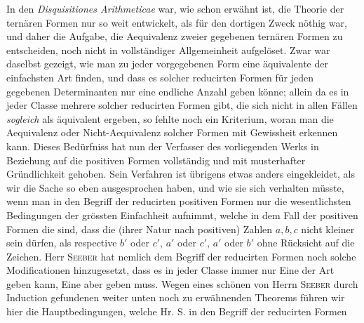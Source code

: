 In den \emph{Disquisitiones Arithmeticae} war, wie schon erwähnt ist, die Theorie der ternären Formen nur so weit entwickelt, als für den dortigen Zweck nöthig war, und daher die Aufgabe, die Aequivalenz zweier gegebenen ternären Formen zu entscheiden, noch nicht in vollständiger Allgemeinheit aufgelöset. Zwar war daselbst gezeigt, wie man zu jeder vorgegebenen Form eine äquivalente der einfachsten Art finden, und dass es solcher reducirten Formen für jeden gegebenen Determinanten nur eine endliche Anzahl geben könne; allein da es in jeder Classe mehrere solcher reducirten Formen gibt, die sich nicht in allen Fällen \emph{sogleich} als äquivalent ergeben, so fehlte noch ein Kriterium, woran man die Aequivalenz oder Nicht-Aequivalenz solcher Formen mit Gewissheit erkennen kann. Dieses Bedürfniss hat nun der Verfasser des vorliegenden Werks in Beziehung auf die positiven Formen vollständig und mit musterhafter Gründlichkeit gehoben. Sein Verfahren ist übrigens etwas anders eingekleidet, als wir die Sache so eben ausgesprochen haben, und wie sie sich verhalten müsste, wenn man in den Begriff der reducirten positiven Formen nur die wesentlichsten Bedingungen der grössten Einfachheit aufnimmt, welche in dem Fall der positiven Formen die sind, dass die (ihrer Natur nach positiven) Zahlen $a,b,c$ nicht kleiner sein dürfen, als respective $b'$ oder $c'$, $a'$ oder $c'$, $a'$ oder $b'$ ohne Rücksicht auf die Zeichen. Herr \textsc{Seeber} hat nemlich dem Begriff der reducirten Formen noch solche Modificationen hinzugesetzt, dass es in jeder Classe immer nur Eine der Art geben kann, Eine aber geben muss. Wegen eines schönen von Herrn \textsc{Seeber} durch Induction gefundenen weiter unten noch zu erwähnenden Theorems führen wir hier die Hauptbedingungen, welche Hr. S. in den Begriff der reducirten Formen 
